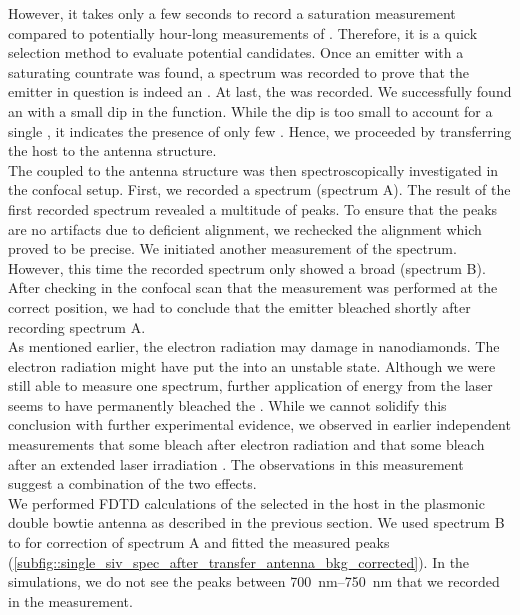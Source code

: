 					However, it takes only a few seconds to record a saturation measurement compared to potentially hour-long measurements of \gtfs.
					Therefore, it is a quick selection method to evaluate potential candidates.
					Once an emitter with a saturating countrate was found, a spectrum was recorded to prove that the emitter in question is indeed an \siv.
					At last, the \gtf was recorded.
					We successfully found an \siv with a small dip in the \gt function.
					While the dip is too small to account for a single \siv, it indicates the presence of only few \sivs.
					Hence, we proceeded by transferring the host \nd to the antenna structure.
					\\
					The \siv coupled to the antenna structure was then spectroscopically investigated in the confocal setup.
					First, we recorded a spectrum (spectrum A).
					The result of the first recorded spectrum revealed a multitude of peaks.
					To ensure that the peaks are no artifacts due to deficient alignment, we rechecked the alignment which proved to be precise.
					We initiated another measurement of the spectrum.
					However, this time the recorded spectrum only showed a broad \bkg (spectrum B).
					After checking in the confocal scan that the measurement was performed at the correct position, we had to conclude that the emitter bleached shortly after recording spectrum A.
					\\
					As mentioned earlier, the electron radiation may damage \sivs in nanodiamonds.
					The electron radiation might have put the \siv into an unstable state.
					Although we were still able to measure one spectrum, further application of energy from the laser seems to have permanently bleached the \siv.
					While we cannot solidify this conclusion with further experimental evidence, we observed in earlier independent measurements that some \sivs bleach after electron radiation and that some \sivs bleach after an extended laser irradiation \cite{}.
					The observations in this measurement suggest a combination of the two effects.
					\\
					We performed FDTD calculations of the selected \siv in the host \nd in the plasmonic double bowtie antenna as described in the previous section.
					We used spectrum B to for \bkg correction of spectrum A and fitted the measured peaks (\cref{subfig::single_siv_spec_after_transfer_antenna_bkg_corrected}).
					In the simulations, we do not see the peaks between \SIrange{700}{750}{nm} that we recorded in the measurement.

